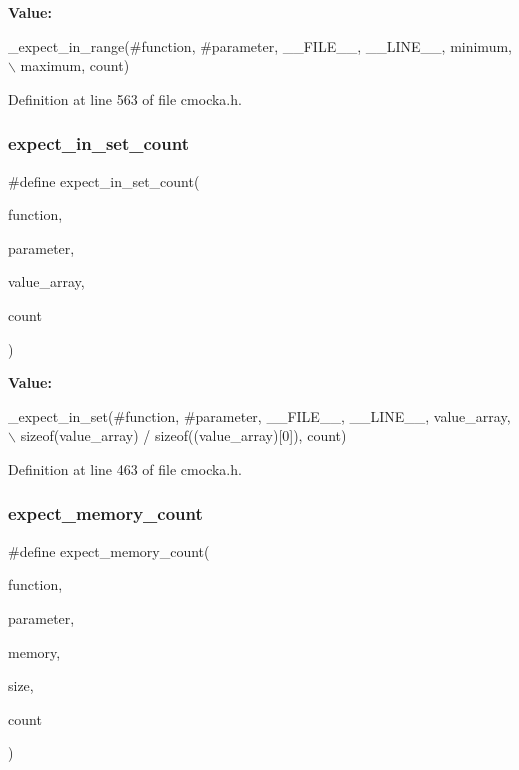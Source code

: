 {\bfseries Value\+:}
\begin{DoxyCode}
\_expect\_in\_range(#\textcolor{keyword}{function}, #parameter, \_\_FILE\_\_, \_\_LINE\_\_, minimum, \(\backslash\)
                     maximum, count)
\end{DoxyCode}


Definition at line 563 of file cmocka.\+h.

\mbox{\label{group__cmocka__param_ga86ddf759ad47f735eeb45ab02af5ba09}} 
\subsubsection{\texorpdfstring{expect\+\_\+in\+\_\+set\+\_\+count}{expect\_in\_set\_count}}
{\footnotesize\ttfamily \#define expect\+\_\+in\+\_\+set\+\_\+count(\begin{DoxyParamCaption}\item[{}]{function,  }\item[{}]{parameter,  }\item[{}]{value\+\_\+array,  }\item[{}]{count }\end{DoxyParamCaption})}

{\bfseries Value\+:}
\begin{DoxyCode}
\_expect\_in\_set(#\textcolor{keyword}{function}, #parameter, \_\_FILE\_\_, \_\_LINE\_\_, value\_array, \(\backslash\)
                   \textcolor{keyword}{sizeof}(value\_array) / \textcolor{keyword}{sizeof}((value\_array)[0]), count)
\end{DoxyCode}


Definition at line 463 of file cmocka.\+h.

\mbox{\label{group__cmocka__param_gae4e55b7867cde89fd250f32f8fb2ed06}} 
\subsubsection{\texorpdfstring{expect\+\_\+memory\+\_\+count}{expect\_memory\_count}}
{\footnotesize\ttfamily \#define expect\+\_\+memory\+\_\+count(\begin{DoxyParamCaption}\item[{}]{function,  }\item[{}]{parameter,  }\item[{}]{memory,  }\item[{}]{size,  }\item[{}]{count }\end{DoxyParamCaption})}

